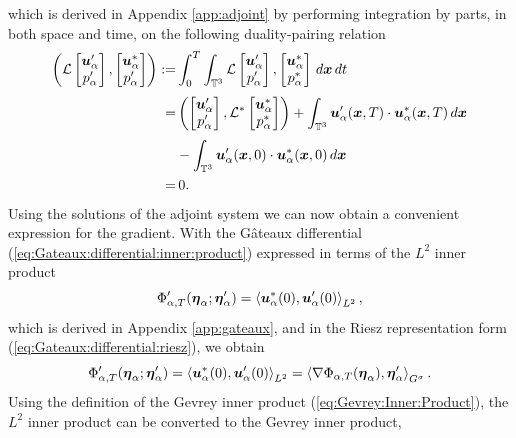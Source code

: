\normalsize
which is derived in Appendix \ref{app:adjoint} by performing integration by parts, in both space and time, on the following duality-pairing relation 
\begin{equation}\label{eq:duality:pairing}
\begin{aligned}
\left(\mathcal{L}\begin{bmatrix}
\boldsymbol u'_\alpha\\
p'_{\alpha}
\end{bmatrix}, \begin{bmatrix}
\boldsymbol u^*_\alpha\\
p'_{\alpha}
\end{bmatrix} \right) :=& \int_0^T\int_{\mathbb{T}^3} \mathcal{L}\begin{bmatrix}
\boldsymbol u'_\alpha\\
p'_{\alpha}
\end{bmatrix}, \begin{bmatrix}
\boldsymbol u^*_\alpha\\
p^*_{\alpha}
\end{bmatrix} \,d\boldsymbol x\,dt \\[3pt]
=& \left( \begin{bmatrix}
\boldsymbol u'_\alpha\\
p'_{\alpha}
\end{bmatrix},\mathcal{L}^*\begin{bmatrix}
\boldsymbol u^*_\alpha\\
p^*_{\alpha}
\end{bmatrix} \right) + \int_{\mathbb{T}^3} \boldsymbol u'_\alpha(\boldsymbol x,T)\cdot \boldsymbol u^*_\alpha(\boldsymbol x,T)\,d\boldsymbol x \\[3pt]
&- \int_{\mathbb{T}^3}\boldsymbol u'_\alpha(\boldsymbol x,0)\cdot \boldsymbol u^*_\alpha(\boldsymbol x,0) \,d\boldsymbol x \\
=& \, 0.
\end{aligned}
\end{equation}
Using the solutions of the adjoint system we can now obtain a convenient expression for the gradient. With the G\^{a}teaux differential (\ref{eq:Gateaux:differential:inner:product}) expressed in terms of the $L^2$ inner product 
\begin{equation}\label{eq:Gateaux:differential:inner:product:2}
\Phi'_{\alpha,T}({\boldsymbol \eta_\alpha};{\boldsymbol \eta'_\alpha}) = \left\langle \boldsymbol u^*_\alpha(0),\boldsymbol u'_\alpha(0)\right\rangle_{L^2},
\end{equation}
which is derived in Appendix \ref{app:gateaux}, and in the Riesz representation form (\ref{eq:Gateaux:differential:riesz}), we obtain
\begin{equation}
\Phi'_{\alpha,T}({\boldsymbol \eta_\alpha};{\boldsymbol \eta'_\alpha}) = \left\langle \boldsymbol u^*_\alpha(0),\boldsymbol u'_\alpha(0)\right\rangle_{L^2} = \left\langle \nabla\Phi_{\alpha,T}({\boldsymbol \eta_\alpha}),{\boldsymbol \eta'_\alpha} \right\rangle_{G^\sigma}.
\end{equation}
Using the definition of the Gevrey inner product (\ref{eq:Gevrey:Inner:Product}), the $L^2$ inner product can be converted to the Gevrey inner product,
